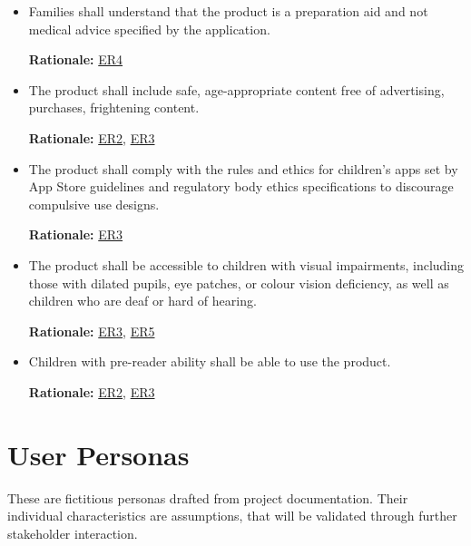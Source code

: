 \documentclass[12pt]{article}
\newcounter{srnum} %
\begin{document}
\begin{itemize}
\item[\textbf{STR\refstepcounter{srnum}\thesrnum:} \label{SR_Label14}] Families shall understand that the product is a preparation 
aid and not medical advice specified by the application.

\textbf{Rationale:} \hyperref[ER4]{ER4}

\item[\textbf{STR\refstepcounter{srnum}\thesrnum:} \label{SR_Label15}] The product shall include safe, age-appropriate content 
free of advertising, purchases, frightening content.

\textbf{Rationale:} \hyperref[ER2]{ER2}, \hyperref[ER3]{ER3}

\item[\textbf{STR\refstepcounter{srnum}\thesrnum:} \label{SR_Label16}] The product shall comply with the rules and ethics for 
children's apps set by App Store guidelines and regulatory body ethics specifications to discourage compulsive use designs.

\textbf{Rationale:} \hyperref[ER3]{ER3}

\item[\textbf{STR\refstepcounter{srnum}\thesrnum:} \label{SR_Label17}] The product shall be accessible to children with visual 
impairments, including those with dilated pupils, eye patches, or colour vision deficiency, as well as children who are deaf 
or hard of hearing.

\textbf{Rationale:} \hyperref[ER3]{ER3}, \hyperref[ER5]{ER5}

\item[\textbf{STR\refstepcounter{srnum}\thesrnum:} \label{SR_Label18}] Children with pre-reader ability shall be able to use 
the product.

\textbf{Rationale:} \hyperref[ER2]{ER2}, \hyperref[ER3]{ER3}

\end{itemize}

\section{User Personas} \label{sec_Personas}
These are fictitious personas drafted from project documentation.
Their individual characteristics are assumptions, that will be validated through further stakeholder interaction.
\end{document}
